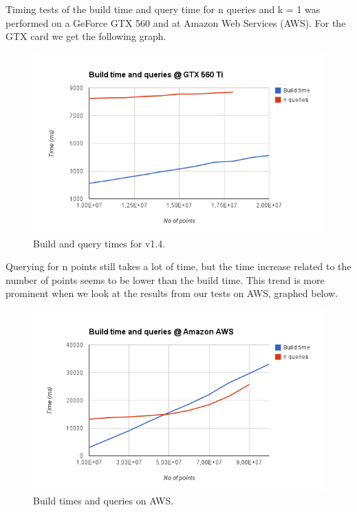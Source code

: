 \begin{enumerate}
\begin{enumerate}
Timing tests of the build time and query time for n queries and k = 1 was performed on a GeForce GTX 560 and at Amazon Web Services (AWS). For the GTX card we get the following graph.

\begin{figure}[ht!]
\centering
\includegraphics[width=120mm]{gfx/v14_build_query_gtx.png}

\caption{Build and query times for v1.4.}
\label{fig:v14_build_query_gtx}
\end{figure}

Querying for n points still takes a lot of time, but the time increase related to the number of points seems to be lower than the build time. This trend is more prominent when we look at the results from our tests on AWS, graphed below.

\begin{figure}[ht!]
\centering
\includegraphics[width=120mm]{gfx/v14_build_query_aws.png}

\caption{Build times and queries on AWS.}
\label{fig:v14_build_query_aws}
\end{figure}


\end{enumerate}
\end{enumerate}
